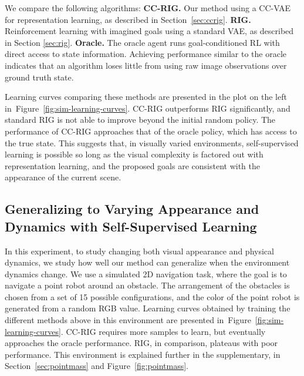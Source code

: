 We compare the following algorithms:
\textbf{CC-RIG.} Our method using a CC-VAE for representation learning, as described in Section~\ref{sec:ccrig}.
\textbf{RIG.} Reinforcement learning with imagined goals \citep{nair2018rig} using a standard VAE, as described in Section \ref{sec:rig}.
\textbf{Oracle.} The oracle agent runs goal-conditioned RL with direct access to state information. Achieving performance similar to the oracle indicates that an algorithm loses little from using raw image observations over ground truth state.

Learning curves comparing these methods are presented in the plot on the left in~Figure~\ref{fig:sim-learning-curves}. CC-RIG outperforms RIG significantly, and standard RIG is not able to improve beyond the initial random policy. The performance of CC-RIG approaches that of the oracle policy, which has access to the true state. This suggests that, in visually varied environments, self-supervised learning is possible so long as the visual complexity is factored out with representation learning, and the proposed goals are consistent with the appearance of the current scene.

\subsection{Generalizing to Varying Appearance and Dynamics with Self-Supervised Learning}

In this experiment, to study changing both visual appearance and physical dynamics, we study how well our method can generalize when the environment dynamics change. We use a simulated 2D navigation task, where the goal is to navigate a point robot around an obstacle. The arrangement of the obstacles is chosen from a set of 15 possible configurations, and the color of the point robot is generated from a random RGB value. Learning curves obtained by training the different methods above in this environment are presented in~Figure~\ref{fig:sim-learning-curves}.
CC-RIG requires more samples to learn, but eventually approaches the oracle performance. RIG, in comparison, plateaus with poor performance. This environment is explained further in the supplementary, in Section~\ref{sec:pointmass} and Figure~\ref{fig:pointmass}.

